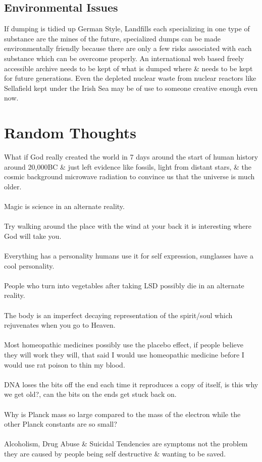 \documentclass[a4paper,12pt,titlepage]{book}
\begin{document}
\section{Environmental Issues}
If dumping is tidied up German Style,
Landfills each specializing in one type of substance
are the mines of the future, specialized dumps
can be made environmentally friendly because
there are only a few risks associated with
each substance which can be overcome properly.
An international web based freely accessible archive needs to be kept of 
what is dumped where \& needs to be kept for future generations.
Even the depleted nuclear waste from nuclear reactors like Sellafield
kept under the Irish Sea may be of use to someone
creative enough even now.
\chapter{Random Thoughts}
What if God really created the world in 7 days
around the start of human history around 20,000BC
\& just left evidence like fossils, light from
distant stars, \& the cosmic background microwave
radiation to convince us that the universe is
much older.\\\\
Magic is science in an alternate reality.\\\\
Try walking around the place with the wind at your
back it is interesting where God will take you.\\\\
Everything has a personality humans use
it for self expression, sunglasses have
a cool personality.\\\\
People who turn into vegetables after taking LSD
possibly die in an alternate reality.\\\\ 
The body is an imperfect decaying representation
of the spirit/soul which rejuvenates when you go to Heaven.\\\\
Most homeopathic medicines possibly use the placebo effect,
if people believe they will work they will,
that said I would use homeopathic medicine before 
I would use rat poison to thin my blood.\\\\
DNA loses the bits off the end each time it
reproduces a copy of itself, is this why we
get old?, can the bits on the ends get stuck back on.\\\\
Why is Planck mass so large compared to the mass of
the electron while the other Planck constants are so small?\\\\
Alcoholism, Drug Abuse \& Suicidal Tendencies
are symptoms not the problem they are caused
by people being self destructive \& wanting to be saved.\\\\
\end{document}

